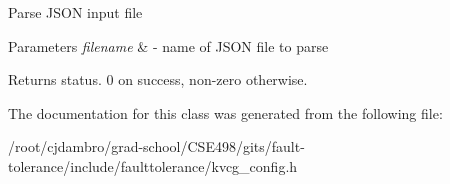 Parse J\+S\+ON input file


\begin{DoxyParams}{Parameters}
{\em filename} & -\/ name of J\+S\+ON file to parse\\
\hline
\end{DoxyParams}
\begin{DoxyReturn}{Returns}
status. 0 on success, non-\/zero otherwise. 
\end{DoxyReturn}


The documentation for this class was generated from the following file\+:\begin{DoxyCompactItemize}
\item 
/root/cjdambro/grad-\/school/\+C\+S\+E498/gits/fault-\/tolerance/include/faulttolerance/kvcg\+\_\+config.\+h\end{DoxyCompactItemize}
